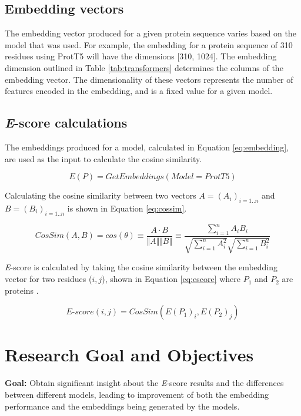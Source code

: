 \documentclass[
	letterpaper, %
	10pt, %
]{journalArticle}
\begin{document}
\subsection{Embedding vectors}
The embedding vector produced for a given protein sequence varies based on the model that was used. For example, the embedding for a protein sequence of 310 residues using ProtT5 will have the dimensions [310, 1024]. The embedding dimension outlined in Table \ref{tab:transformers} determines the columns of the embedding vector. The dimensionality of these vectors represents the number of features encoded in the embedding, and is a fixed value for a given model.

\subsection{\textit{E}-score calculations}
The embeddings produced for a model, calculated in Equation \ref{eq:embedding}, are used as the input to calculate the cosine similarity.

\begin{equation}
    E(P) = GetEmbeddings(Model = ProtT5)
    \label{eq:embedding}
\end{equation}

Calculating the cosine similarity between two vectors \(A = (A_i)_{i=1..n}\) and \(B = (B_i)_{i=1..n}\) is shown in Equation \ref{eq:cossim}.

\begin{equation}
	CosSim(A, B) = cos(\theta) \equiv \frac{A \cdot B}{\Vert A \Vert \Vert B \Vert} \equiv \frac{\sum\limits_{i=1}^{n} A_iB_i}{\sqrt{\sum\limits_{i=1}^{n} A_i^2}\sqrt{\sum\limits_{i=1}^{n} B_i^2}}
	\label{eq:cossim}
\end{equation}

\textit{E}-score is calculated by taking the cosine similarity between the embedding vector for two residues (\(i, j\)), shown in Equation \ref{eq:escore} where \(P_1\) and \(P_2\) are proteins \autocite{Ashrafzadeh:2023}.

\begin{equation}
    \textit{E}\mbox{-}score(i,j) = CosSim(E(P_1)_i, E(P_2)_j)
    \label{eq:escore}
\end{equation}

\section{Research Goal and Objectives}
\textbf{Goal: }Obtain significant insight about the \textit{E}-score results and the differences between different models, leading to improvement of both the embedding performance and the embeddings being generated by the models.
\end{document}
